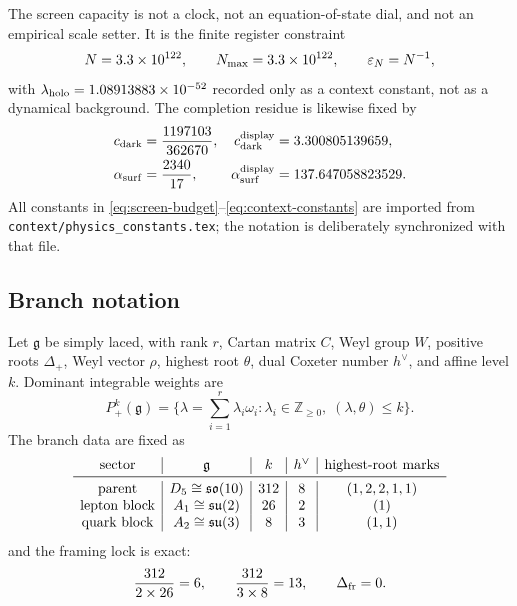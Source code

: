 \documentclass[11pt]{article}
\begin{document}
The screen capacity is not a clock, not an equation-of-state dial, and not an empirical scale setter.  It is the finite register constraint
\begin{equation}
  N=3.3\times10^{122},
  \qquad
  N_{\max}=3.3\times10^{122},
  \qquad
  \varepsilon_N=N^{-1},
  \label{eq:screen-budget}
\end{equation}
with \(\lambda_{\mathrm{holo}}=1.08913883\times10^{-52}\) recorded only as a context constant, not as a dynamical background.  The completion residue is likewise fixed by
\begin{equation}
\begin{aligned}
  c_{\mathrm{dark}}&=\frac{1197103}{362670},
  &c_{\mathrm{dark}}^{\mathrm{display}}&=3.300805139659,\\
  \alpha_{\mathrm{surf}}&=\frac{2340}{17},
  &\alpha_{\mathrm{surf}}^{\mathrm{display}}&=137.647058823529.
\end{aligned}
  \label{eq:context-constants}
\end{equation}
All constants in \eqref{eq:screen-budget}--\eqref{eq:context-constants} are imported from \texttt{context/physics\_constants.tex}; the notation is deliberately synchronized with that file.

\subsection{Branch notation}
Let \(\mathfrak{g}\) be simply laced, with rank \(r\), Cartan matrix \(C\), Weyl group \(W\), positive roots \(\Delta_+\), Weyl vector \(\rho\), highest root \(\theta\), dual Coxeter number \(h^\vee\), and affine level \(k\).  Dominant integrable weights are
\begin{equation}
  P_+^k(\mathfrak{g})
  =\{\lambda=\sum_{i=1}^r\lambda_i\omega_i:\lambda_i\in\mathbb{Z}_{\ge0},\; (\lambda,\theta)\le k\}.
  \label{eq:integrable-weights}
\end{equation}
The branch data are fixed as
\begin{equation}
\begin{array}{c|c|c|c|c}
\text{sector} & \mathfrak{g} & k & h^\vee & \text{highest-root marks} \\
\midrule
\text{parent} & D_5\cong\mathfrak{so}(10) & \benchmarkParentLevel & 8 & (1,2,2,1,1) \\
\text{lepton block} & A_1\cong\mathfrak{su}(2) & \benchmarkLeptonLevel & 2 & (1) \\
\text{quark block} & A_2\cong\mathfrak{su}(3) & \benchmarkQuarkLevel & 3 & (1,1)
\end{array}
\label{eq:branch-data}
\end{equation}
and the framing lock is exact:
\begin{equation}
  \frac{312}{2 \times 26}=6,
  \qquad
  \frac{312}{3 \times 8}=13,
  \qquad
  \Delta_{\mathrm{fr}}=0.
  \label{eq:framing-lock}
\end{equation}
\end{document}
